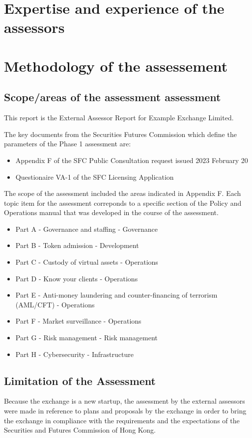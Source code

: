 \documentclass[]{report}
\def\firmfullname{Example Exchange Limited}
\begin{document}
\chapter{Expertise and experience of the assessors}


\chapter{Methodology of the assessement}
\section{Scope/areas of the assessment assessment}

This report is the External Assessor Report for \firmfullname.  

The key documents from the Securities Futures Commission which define
the parameters of the Phase 1 assessment are:

\begin{itemize}
  \item Appendix F of the SFC Public Consultation request issued
    2023 February 20
  \item Questionaire VA-1 of the SFC Licensing Application
\end{itemize}

The scope of the assessment included the areas indicated in Appendix
F.  Each topic item for the assessment correponds to a specific
section of the Policy and Operations manual that was developed in the
course of the assessment.

\begin{itemize}
\item Part A - Governance and staffing - Governance
\item Part B - Token admission - Development
\item Part C - Custody of virtual assets - Operations
\item Part D - Know your clients - Operations
\item Part E - Anti-money laundering and counter-financing of
  terrorism (AML/CFT) - Operations
\item Part F - Market surveillance - Operations
\item Part G - Risk management - Risk management
\item Part H - Cybersecurity - Infrastructure
\end{itemize}


\section{Limitation of the Assessment}
Because the exchange is a new startup, the assessment by the external
assessors were made in reference to plans and proposals by the
exchange in order to bring the exchange in compliance with the
requirements and the expectations of the Securities and Futures
Commission of Hong Kong.
\end{document}
